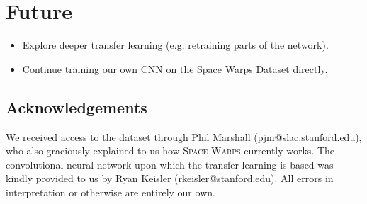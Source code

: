 \documentclass{ucbposter}
\begin{document}
\section{Future}
\begin{itemize}
  \item{Explore deeper transfer learning (e.g. retraining parts of the
    network).}
  \item{Continue training our own CNN on the Space Warps Dataset directly.}
\end{itemize}

\subsection{Acknowledgements}
We received access to the dataset through Phil Marshall
(\url{pjm@slac.stanford.edu}), who also graciously explained to us how
\textsc{Space Warps}
currently works. The convolutional neural network upon which the transfer
learning is based was kindly provided to us by Ryan Keisler
(\url{rkeisler@stanford.edu}).
All errors in interpretation or otherwise are entirely our own.
\end{document}
